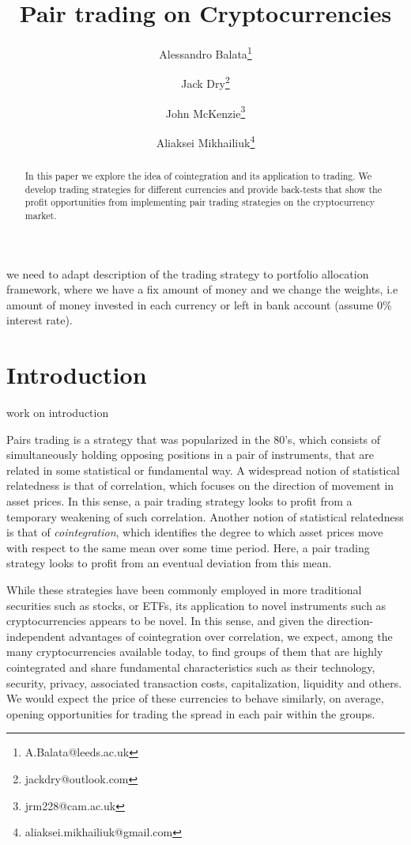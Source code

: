 \documentclass[a4paper,11pt]{article}
\title{Pair trading on Cryptocurrencies}
\author{Alessandro Balata\thanks{A.Balata@leeds.ac.uk} }
\author{Jack Dry\thanks{jack\textunderscore dry@outlook.com}}
\author{John McKenzie\thanks{jrm228@cam.ac.uk}}
\author{Aliaksei Mikhailiuk\thanks{aliaksei.mikhailiuk@gmail.com}}
\affil{The Quant Group - \textit{www.thequantgroup.org} -}
\theoremstyle{remark}
\theoremstyle{plain}
\newcommand\ab[1]{{\color{blue} #1 }}
\begin{document}
\maketitle

\begin{abstract}
In this paper we explore the idea of cointegration and its application to trading. We develop trading strategies for different currencies and provide back-tests that show the profit opportunities from implementing pair trading strategies on the cryptocurrency market.
\end{abstract}

\ab{we need to adapt description of the trading strategy to portfolio allocation framework, where we have a fix amount of money and we change the weights, i.e amount of money invested in each currency or left in bank account (assume 0\% interest rate).}

\section{Introduction}

\ab{work on introduction}

Pairs trading is a strategy that was popularized in the 80's, which consists of simultaneously holding opposing positions in a pair of instruments, that are related in some statistical or fundamental way. A widespread notion of statistical relatedness is that of correlation, which focuses on the direction of movement in asset prices. In this sense, a pair trading strategy looks to profit from a temporary weakening of such correlation. Another notion of statistical relatedness is that of \textit{cointegration}, which identifies the degree to which asset prices move with respect to the same mean over some time period. Here, a pair trading strategy looks to profit from an eventual deviation from this mean.

While these strategies have been commonly employed in more traditional securities such as stocks, or ETFs, its application to novel instruments such as cryptocurrencies appears to be novel. In this sense, and given the direction-independent advantages of cointegration over correlation, we expect, among the many cryptocurrencies available today, to find groups of them that are highly cointegrated and share fundamental characteristics such as their technology, security, privacy, associated transaction costs, capitalization, liquidity and others. We would expect the price of these currencies to behave similarly, on average, opening opportunities for trading the spread in each pair within the groups.
\end{document}
